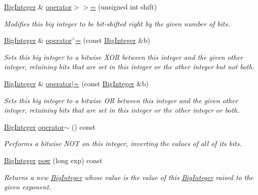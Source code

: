 \begin{DoxyCompactItemize}
\mbox{\hyperlink{classBigInteger}{Big\+Integer}} \& \mbox{\hyperlink{classBigInteger_a17190065589ad02d573bbaa3dcb82d2d}{operator$>$$>$=}} (unsigned int shift)
\begin{DoxyCompactList}\small\item\em Modifies this big integer to be bit-\/shifted right by the given number of bits. \end{DoxyCompactList}\item 
\mbox{\hyperlink{classBigInteger}{Big\+Integer}} \& \mbox{\hyperlink{classBigInteger_a99978a2a6d7f37e3e87e784e09368df8}{operator$^\wedge$=}} (const \mbox{\hyperlink{classBigInteger}{Big\+Integer}} \&b)
\begin{DoxyCompactList}\small\item\em Sets this big integer to a bitwise X\+OR between this integer and the given other integer, retaining bits that are set in this integer or the other integer but not both. \end{DoxyCompactList}\item 
\mbox{\hyperlink{classBigInteger}{Big\+Integer}} \& \mbox{\hyperlink{classBigInteger_a1281c69428fefa18e91598c70d7376de}{operator$\vert$=}} (const \mbox{\hyperlink{classBigInteger}{Big\+Integer}} \&b)
\begin{DoxyCompactList}\small\item\em Sets this big integer to a bitwise OR between this integer and the given other integer, retaining bits that are set in this integer or the other integer or both. \end{DoxyCompactList}\item 
\mbox{\hyperlink{classBigInteger}{Big\+Integer}} \mbox{\hyperlink{classBigInteger_ad06e5ca20705adbe0670ba54fcb3323e}{operator$\sim$}} () const
\begin{DoxyCompactList}\small\item\em Performs a bitwise N\+OT on this integer, inverting the values of all of its bits. \end{DoxyCompactList}\item 
\mbox{\hyperlink{classBigInteger}{Big\+Integer}} \mbox{\hyperlink{classBigInteger_a2679d1fe9cb5daed464a9ab0783e2825}{pow}} (long exp) const
\begin{DoxyCompactList}\small\item\em Returns a new \mbox{\hyperlink{classBigInteger}{Big\+Integer}} whose value is the value of this \mbox{\hyperlink{classBigInteger}{Big\+Integer}} raised to the given exponent. \end{DoxyCompactList}\item 

\end{DoxyCompactItemize}
